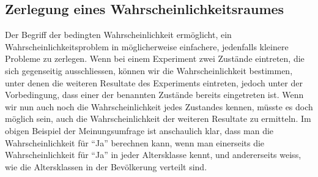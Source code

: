 \subsection{Zerlegung eines Wahrscheinlichkeitsraumes}
Der
Begriff der bedingten Wahrscheinlichkeit ermöglicht,
ein Wahrscheinlichkeitsproblem in möglicherweise einfachere, jedenfalls
kleinere Probleme zu zerlegen.
Wenn bei einem Experiment zwei Zustände
eintreten, die sich gegenseitig ausschliessen, können wir die 
Wahrscheinlichkeit bestimmen, unter denen die weiteren Resultate
des Experiments eintreten, jedoch unter der Vorbedingung, dass einer
der benannten Zustände bereits eingetreten ist.
Wenn wir nun auch
noch die Wahrscheinlichkeit jedes Zustandes kennen, müsste es doch
möglich sein, auch die Wahrscheinlichkeit der weiteren Resultate zu
ermitteln.
Im obigen Beispiel der Meinungsumfrage ist anschaulich klar, dass man die
Wahrscheinlichkeit für ``Ja'' berechnen kann, wenn man einerseits die
Wahrscheinlichkeit für ``Ja'' in  jeder Altersklasse kennt, und andererseits
weiss, wie die Altersklassen in der Bevölkerung verteilt sind.

